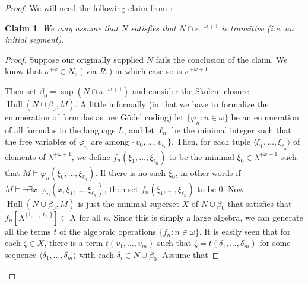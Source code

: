 \documentclass{amsart}
\theoremstyle{plain}
\theoremstyle{definition}
\theoremstyle{remark}
\theoremstyle{plain}
\newtheorem*{claim*}{Claim}
\theoremstyle{definition}
\theoremstyle{remark}
\begin{document}
\begin{proof}
            We will need the following claim from \cite{MR1045371}:

            \begin{claim*} We may assume that $N$ satisfies that
             $N\cap \kappa^{+\omega+1}$ is transitive (i.e. an initial segment).
            \end{claim*}

            \bgroup
            \def\proofname{Proof of Claim:\/}

            \begin{proof}
            Suppose  our originally supplied $N$ fails the conclusion of the
            claim.
            We   know that $\kappa^{+\omega}\in N$,
            (  via $R_1$)
            in which case so is $\kappa^{+\omega+1}$.


            Then set $\beta_0 = \sup(N\cap \kappa^{+\omega+1})$ and consider the
            Skolem closure $\mathop{Hull}(N\cup \beta_0, M)$.  A little informally
            (in that we have to formalize the enumeration of formulas as per
            G\"odel coding)
            let $\{\varphi_n : n\in \omega\}$ be an enumeration of all formulas
            in the language $L$, and let  $\ell_n$ be the minimal integer such
            that the free variables of $\varphi_n$ are among
             $\{ v_0, \ldots, v_{\ell_n}\}$.
            Then,   for each tuple
            $\langle \xi_1,\ldots, \xi_{\ell_n} \rangle$
            of elements of $\lambda^{+\omega+1}$,
             we define $f_n(\xi_1,\ldots, \xi_{\ell_n})$ to be
             the minimal $\xi_0\in \lambda^{+\omega+1}$ such that
             $M\models \varphi_n(\xi_0,\ldots, \xi_{\ell_n})$.
            If there is no such $\xi_0$,
               in other words if $M\models \lnot\exists x~~  \varphi_n(x,\xi_1,
            \ldots,\xi_{\ell_n})$, then set
             $f_n(\xi_1,\ldots, \xi_{\ell_n})$ to be $0$.
            Now $\mathop{Hull}(N\cup \beta_0,M)$ is just the minimal superset
             $X$
            of $N\cup \beta_0$ that satisfies that
             $f_n[X^{\{1,\ldots,\ell_n\}}] \subset X$ for all $n$. Since this is
             simply a large algebra, we can generate all the terms $t$ of
            the algebraic operations $\{ f_n : n\in \omega\}$.
            It is easily seen that for each $\zeta \in X$, there is a term
            $t(v_1,\ldots, v_m)$ such that $\zeta  = t(\delta_1,\ldots, \delta_m)$
             for some sequence $\langle \delta_1,\ldots, \delta_m\rangle$ with
             each $\delta_i\in  N\cup \beta_0$.
             Assume that

\end{proof}
\end{proof}
\end{document}
